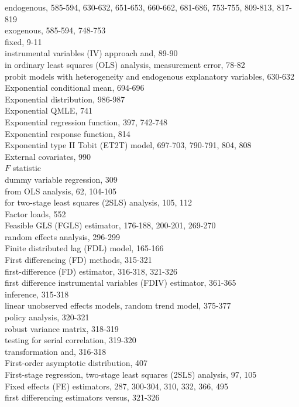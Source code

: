 \documentclass[10pt]{article}
\begin{document}
endogenous, 585-594, 630-632, 651-653, 660-662, 681-686, 753-755, 809-813, 817-819\\
exogenous, 585-594, 748-753\\
fixed, 9-11\\
instrumental variables (IV) approach and, 89-90\\
in ordinary least squares (OLS) analysis, measurement error, 78-82\\
probit models with heterogeneity and endogenous explanatory variables, 630-632\\
Exponential conditional mean, 694-696\\
Exponential distribution, 986-987\\
Exponential QMLE, 741\\
Exponential regression function, 397, 742-748\\
Exponential response function, 814\\
Exponential type II Tobit (ET2T) model, 697-703, 790-791, 804, 808\\
External covariates, 990\\
$F$ statistic\\
dummy variable regression, 309\\
from OLS analysis, 62, 104-105\\
for two-stage least squares (2SLS) analysis, 105, 112\\
Factor loads, 552\\
Feasible GLS (FGLS) estimator, 176-188, 200-201, 269-270\\
random effects analysis, 296-299\\
Finite distributed lag (FDL) model, 165-166\\
First differencing (FD) methods, 315-321\\
first-difference (FD) estimator, 316-318, 321-326\\
first difference instrumental variables (FDIV) estimator, 361-365\\
inference, 315-318\\
linear unobserved effects models, random trend model, 375-377\\
policy analysis, 320-321\\
robust variance matrix, 318-319\\
testing for serial correlation, 319-320\\
transformation and, 316-318\\
First-order asymptotic distribution, 407\\
First-stage regression, two-stage least squares (2SLS) analysis, 97, 105\\
Fixed effects (FE) estimators, 287, 300-304, 310, 332, 366, 495\\
first differencing estimators versus, 321-326
\end{document}
